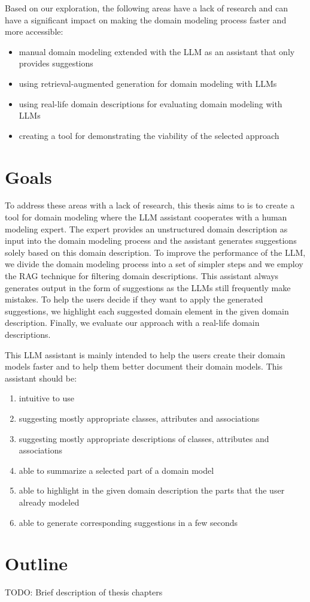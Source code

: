 Based on our exploration, the following areas have a lack of research and can have a significant impact on making the domain modeling process faster and more accessible:

\begin{itemize}
\item manual domain modeling extended with the LLM as an assistant that only provides suggestions
\item using retrieval-augmented generation for domain modeling with LLMs
\item using real-life domain descriptions for evaluating domain modeling with LLMs
\item creating a tool for demonstrating the viability of the selected approach
\end{itemize}


\section*{Goals}

To address these areas with a lack of research, this thesis aims to is to create a tool for domain modeling where the LLM assistant cooperates with a human modeling expert. The expert provides an unstructured domain description as input into the domain modeling process and the assistant generates suggestions solely based on this domain description. To improve the performance of the LLM, we divide the domain modeling process into a set of simpler steps and we employ the RAG technique for filtering domain descriptions. This assistant always generates output in the form of suggestions as the LLMs still frequently make mistakes. To help the users decide if they want to apply the generated suggestions, we highlight each suggested domain element in the given domain description. Finally, we evaluate our approach with a real-life domain descriptions.

This LLM assistant is mainly intended to help the users create their domain models faster and to help them better document their domain models. This assistant should be:

\begin{enumerate}
\item intuitive to use
\item suggesting mostly appropriate classes, attributes and associations
\item suggesting mostly appropriate descriptions of classes, attributes and associations
\item able to summarize a selected part of a domain model
\item able to highlight in the given domain description the parts that the user already modeled
\item able to generate corresponding suggestions in a few seconds
\end{enumerate}


\section*{Outline}

TODO: Brief description of thesis chapters